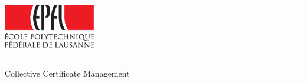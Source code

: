 
%        




\newcommand{\logoepfl}[0]{
  \begin{center}
    \includegraphics[width=4cm]{logo_epfl_coul.eps}
  \end{center}
  \vspace{0.3cm}
  \hrule
}
\newcommand{\project}[1]{
  \begin{center}
    \large{#1}
  \end{center}
  \vspace{1cm}
}
\newcommand{\department}[1]{
  \begin{center}
    \large{#1}
  \end{center}
}
\newcommand{\lab}[1]{
  \begin{center}
    \large{#1}
  \end{center}
}
\newcommand{\supervisor}[3]{
  \begin{center}
    \begin{normalsize}{
        \bf #1}\\#2\\#3
    \end{normalsize}
  \end{center}
}
\renewcommand{\author}[1]{
  \begin{center}
    \Large{#1}
  \end{center}
  \vspace{0.5cm}
}
\renewcommand{\title}[1]{
  \vspace{3cm}
  \begin{center}
    \huge{#1}
  \end{center}
  \vspace{1.7cm}
}
\renewcommand{\date}[2]{
  \begin{center}
    \normalsize{#1 #2}
  \end{center}
  \vspace{0.5cm}
}


\thispagestyle{empty}


  \logoepfl
  
  \title{Collective Certificate Management}
  

